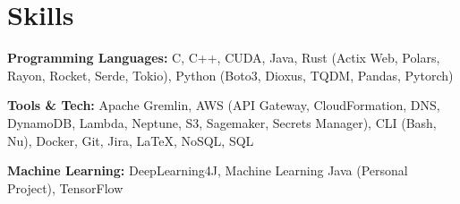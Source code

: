﻿
\section{Skills}

\textbf{Programming Languages: } C, C++, CUDA, Java, Rust (Actix Web, Polars, Rayon, Rocket, Serde, Tokio), Python (Boto3, Dioxus, TQDM, Pandas, Pytorch)

\bigbreak

\textbf{Tools \& Tech: } Apache Gremlin, AWS (API Gateway, CloudFormation, DNS, DynamoDB, Lambda, Neptune, S3, Sagemaker, Secrets Manager), CLI (Bash, Nu), Docker, Git, Jira, \LaTeX, NoSQL, SQL

\bigbreak

\textbf{Machine Learning: } DeepLearning4J, Machine Learning Java (Personal Project), TensorFlow